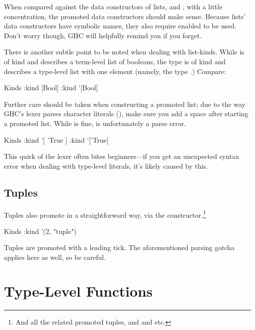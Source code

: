 \documentclass[book.tex]{subfiles}
\begin{document}
When compared against the data constructors of lists, \hs{[] :: [a]} and , with a little concentration, the promoted data constructors
should make sense.  Because lists' data constructors have symbolic names, they
also require  enabled to be used. Don't worry though, GHC
will helpfully remind you if you forget.

There is another subtle point to be noted when dealing with list-kinds. While
\ty{[Bool]} is of kind  and describes a term-level list of booleans,
the type  is of kind \kind{[Type]} and describes a type-level list
with one element (namely, the type .) Compare:

\begin{dorepl}{Kinds}
:kind [Bool]
:kind '[Bool]
\end{dorepl}

Further care should be taken when constructing a promoted list; due to the way
GHC's lexer parses character literals (), make sure you add a space
after starting a promoted list. While  is fine,  is
unfortunately a parse error.

\begin{dorepl}{Kinds}
:kind '[ 'True ]
:kind '['True]
\end{dorepl}

This quirk of the lexer often bites beginners---if you get an unexpected syntax
error when dealing with type-level literals, it's likely caused by this.


\subsection{Tuples}

Tuples also promote in a straightforward way, via the 
constructor.\footnote{And all the related promoted tuples,  and
 and etc.}

\begin{dorepl}{Kinds}
:kind '(2, "tuple")
\end{dorepl}

Tuples are promoted with a leading tick. The aforementioned parsing gotcha
applies here as well, so be careful.


\section{Type-Level Functions}

\end{document}
